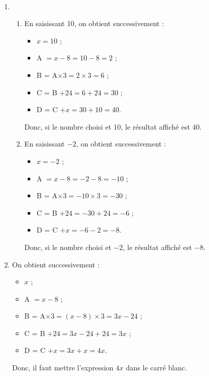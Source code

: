 \ \\ [-5mm]
\begin{enumerate}
   \item
   \begin{enumerate}
      \item En saisissant 10, on obtient successivement :
      \begin{itemize}
         \item $x =10$ ;
         \item A $= x-8 =10-8 =2$ ;
         \item B = A$\times3 =2\times3 =6$ ;
         \item C =  B $+24 =6+24 =30$ ;
         \item D = C $+x =30+10 =40$.
      \end{itemize}
      Donc, {\blue si le nombre choisi et 10, le résultat affiché est 40}.
      \item En saisissant $-2$, on obtient successivement :
      \begin{itemize}
         \item $x =-2$ ;
         \item A $= x-8 =-2-8 =-10$ ;
         \item B = A$\times3 =-10\times3 =-30$ ;
         \item C = B $+24 =-30+24 =-6$ ;
         \item D = C $+x =-6-2 =-8$.
      \end{itemize}
      Donc, {\blue si le nombre choisi et $-2$, le résultat affiché est $-8$}.
   \end{enumerate}
   \item On obtient successivement :
      \begin{itemize}
         \item $x$ ;
         \item A $= x-8$ ;
         \item B = A$\times3 =(x-8)\times3 =3x-24$ ;
         \item C = B $+24 =3x-24+24 =3x$ ;
         \item D = C $+x =3x+x =4x$.
      \end{itemize}
      Donc, {\blue il faut mettre l'expression $4x$ dans le carré blanc}.
\end{enumerate}

